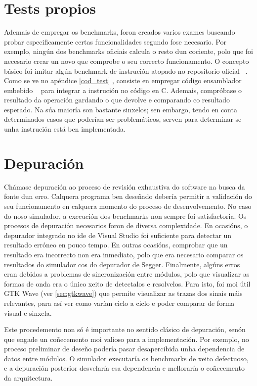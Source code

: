 \section{Tests propios}\label{sec:tests}
Ademais de empregar os benchmarks, foron creados varios exames buscando probar especificamente certas funcionalidades segundo fose necesario. Por exemplo, ningún dos benchmarks oficiais calcula o resto dun cociente, polo que foi necesario crear un novo que comprobe o seu correcto funcionamento. O concepto básico foi imitar algún benchmark de instrución atopado no repositorio oficial ~\cite{riscv_tests}. Como se ve no apéndice \ref{cod_test} , consiste en empregar código ensamblador embebido ~\cite{asm_emb} para integrar a instrución no código en C. Ademais, compróbase o resultado da operación gardando o que devolve e comparando co resultado esperado. Na súa maioría son bastante sinxelos; sen embargo, tendo en conta determinados casos que poderían ser problemáticos, serven para determinar se unha instrución está ben implementada.


\section{Depuración}\label{sec:depuración}

Chámase depuración ao proceso de revisión exhaustiva do software na busca da fonte dun erro. Calquera programa ben deseñado debería permitir a validación do seu funcionamento en calquera momento do  proceso de desenvolvemento. No caso do noso simulador, a execución dos benchmarks non sempre foi satisfactoria. Os procesos de depuración necesarios foron de diversa complexidade. En ocasións, o depurador integrado no \acrshort{ide} de Visual Studio foi suficiente para detectar un resultado erróneo en pouco tempo. En outras ocasións, comprobar que un resultado era incorrecto non era inmediato, polo que era necesario comparar os resultados do simulador cos do depurador de Segger. Finalmente, algúns erros eran debidos a problemas de sincronización entre módulos, polo que visualizar as formas de onda era o único xeito de detectalos e resolvelos. Para isto, foi moi útil GTK Wave (ver \ref{sec:gtkwave}) que permite visualizar as trazas dos sinais máis relevantes, para así ver como varían ciclo a ciclo e poder comparar de forma visual e sinxela.

Este procedemento non só é importante no sentido clásico de depuración, senón que engade un coñecemento moi valioso para a implementación. Por exemplo, no proceso preliminar de deseño podería pasar desapercibida unha dependencia de datos entre módulos. O simulador executaría os benchmarks de xeito defectuoso, e a depuración posterior desvelaría esa dependencia e melloraría o coñecemento da arquitectura. 

